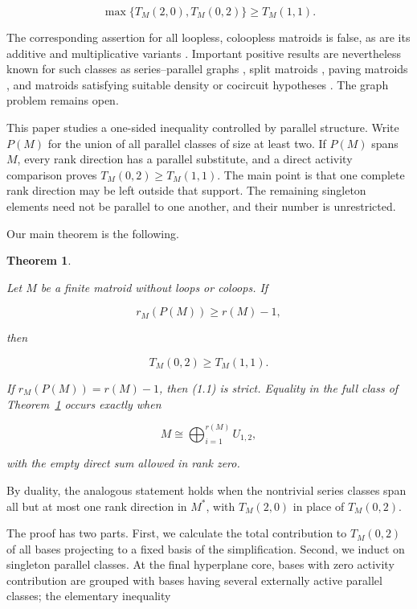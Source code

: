\documentclass[11pt]{article}
\newtheorem{theorem}{Theorem}[section]
\begin{document}
\[
\max\{T_M(2,0),T_M(0,2)\}\ge T_M(1,1).
\]

The corresponding assertion for all loopless, coloopless matroids is false,
as are its additive and multiplicative variants \cite{beke-et-al}. Important positive
results are nevertheless known for such classes as series--parallel graphs
\cite{noble-royle}, split matroids \cite{ferroni-schroeter}, paving matroids \cite{chavez-lomeli-et-al}, and matroids satisfying suitable
density or cocircuit hypotheses \cite{kung}. The graph problem remains open.

This paper studies a one-sided inequality controlled by parallel structure.
Write \(P(M)\) for the union of all parallel classes of size at least two. If
\(P(M)\) spans \(M\), every rank direction has a parallel substitute, and a
direct activity comparison proves \(T_M(0,2)\ge T_M(1,1)\). The main point is
that one complete rank direction may be left outside that support. The
remaining singleton elements need not be parallel to one another, and their
number is unrestricted.

Our main theorem is the following.

\Needspace{0.18\textheight}
\begin{theorem}
\label{thm:main}

Let \(M\) be a finite matroid without loops or coloops. If

\[
r_M(P(M))\ge r(M)-1,
\]

then

\[
T_M(0,2)\ge T_M(1,1).                         \tag{1.1}
\]

If \(r_M(P(M))=r(M)-1\), then (1.1) is strict. Equality in the full class of
Theorem~\ref{thm:main} occurs exactly when

\[
M\cong\bigoplus_{i=1}^{r(M)}U_{1,2},           \tag{1.2}
\]

with the empty direct sum allowed in rank zero.

\end{theorem}

By duality, the analogous statement holds when the nontrivial series classes
span all but at most one rank direction in \(M^*\), with \(T_M(2,0)\) in
place of \(T_M(0,2)\).

The proof has two parts. First, we calculate the total contribution to
\(T_M(0,2)\) of all bases projecting to a fixed basis of the simplification.
Second, we induct on singleton parallel classes. At the final hyperplane core,
bases with zero activity contribution are grouped with bases having several
externally active parallel classes; the elementary inequality
\end{document}
